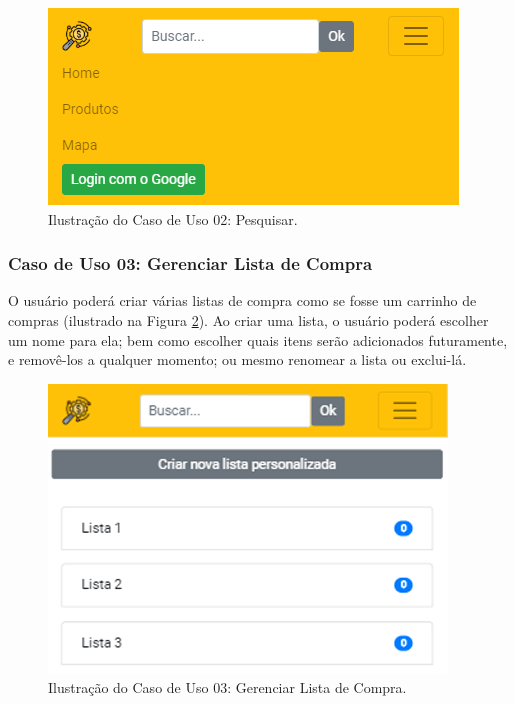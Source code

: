 \begin{figure}[H]
\centering
\includegraphics[width=\linewidth]{figuras/tela-menu.png}
\caption{Ilustração do Caso de Uso 02: Pesquisar.}
\label{fig:menu}
\end{figure}

\subsubsection{Caso de Uso 03: Gerenciar Lista de Compra}

O usuário poderá criar várias listas de compra como se fosse um carrinho de compras (ilustrado na Figura  \ref{fig:lista}). Ao criar uma lista, o usuário poderá escolher um nome para ela; bem como escolher quais itens serão adicionados futuramente, e removê-los a qualquer momento; ou mesmo renomear a lista ou exclui-lá.

\begin{figure}[H]
\centering
\includegraphics[width=\linewidth]{figuras/tela_lista_personalizada.png}
\caption{Ilustração do Caso de Uso 03: Gerenciar Lista de Compra.}
\label{fig:lista}
\end{figure}

